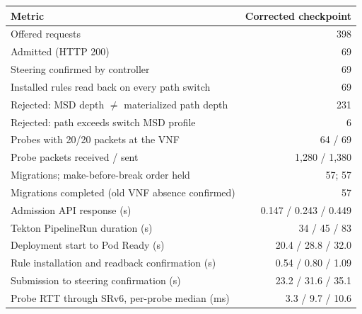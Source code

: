 \begin{tabularx}{\columnwidth}{@{}>{\raggedright\arraybackslash}Xr@{}}
\toprule
Metric & Corrected checkpoint \\
\midrule
Offered requests & 398 \\
Admitted (HTTP 200) & 69 \\
Steering confirmed by controller & 69 \\
Installed rules read back on every path switch & 69 \\
Rejected: MSD depth $\neq$ materialized path depth & 231 \\
Rejected: path exceeds switch MSD profile & 6 \\
Probes with 20/20 packets at the VNF & 64 / 69 \\
Probe packets received / sent & 1,280 / 1,380 \\
Migrations; make-before-break order held & 57; 57 \\
Migrations completed (old VNF absence confirmed) & 57 \\
Admission API response (s) & 0.147 / 0.243 / 0.449 \\
Tekton PipelineRun duration (s) & 34 / 45 / 83 \\
Deployment start to Pod Ready (s) & 20.4 / 28.8 / 32.0 \\
Rule installation and readback confirmation (s) & 0.54 / 0.80 / 1.09 \\
Submission to steering confirmation (s) & 23.2 / 31.6 / 35.1 \\
Probe RTT through SRv6, per-probe median (ms) & 3.3 / 9.7 / 10.6 \\
\bottomrule
\end{tabularx}
